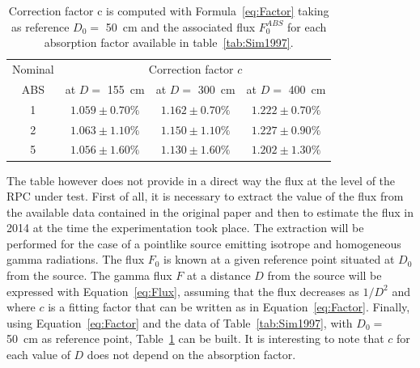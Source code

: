 \newpage
	
\begingroup\setlength{\intextsep}{5pt}\setlength{\columnsep}{15pt}
	
	\begin{table}
		\centering
		\begin{tabular}{|*{4}{c|}}
			\hline
			Nominal & \multicolumn{3}{c|}{Correction factor $c$}                         \\
			ABS     & at $D=$ \SI{155}{cm} & at $D=$ \SI{300}{cm} & at $D=$ \SI{400}{cm} \\
			\hline
			1       & $1.059 \pm 0.70\%$   & $1.162 \pm 0.70\%$   & $1.222 \pm 0.70\%$   \\
			\hline
			2       & $1.063 \pm 1.10\%$   & $1.150 \pm 1.10\%$   & $1.227 \pm 0.90\%$   \\
			\hline
			5       & $1.056 \pm 1.60\%$   & $1.130 \pm 1.60\%$   & $1.202 \pm 1.30\%$   \\
			\hline
		\end{tabular}
		\caption{\label{tab:CorrFactor} Correction factor c is computed with Formula~\ref{eq:Factor} taking as reference $D_0 =$ \SI{50}{cm} and the associated flux $F_0^{ABS}$ for each absorption factor available in table~\ref{tab:Sim1997}.}
	\end{table}
	
	The table however does not provide in a direct way the flux at the level of the RPC under test. First of all, it is necessary to extract the value of the flux from the available data contained in the original paper and then to estimate the flux in 2014 at the time the experimentation took place. The extraction will be performed for the case of a pointlike source emitting isotrope and homogeneous gamma radiations. The flux $F_0$ is known at a given reference point situated at $D_0$ from the source. The gamma flux $F$ at a distance $D$ from the source will be expressed with Equation~\ref{eq:Flux}, assuming that the flux decreases as $1/D^2$ and where $c$ is a fitting factor that can be written as in Equation~\ref{eq:Factor}. Finally, using Equation~\ref{eq:Factor} and the data of Table~\ref{tab:Sim1997}, with $D_0=$ \SI{50}{cm} as reference point, Table~\ref{tab:CorrFactor} can be built. It is interesting to note that $c$ for each value of $D$ does not depend on the absorption factor.

\endgroup
	
